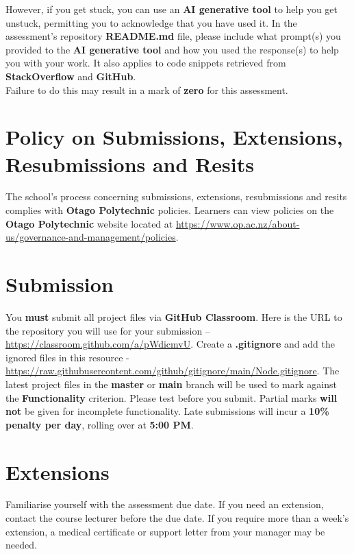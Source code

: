 \documentclass{article}
\begin{document}
 However, if you get stuck, you can use an \textbf{AI generative tool} to help you get unstuck, permitting you to acknowledge that you have used it. In the assessment's repository \textbf{README.md} file, please include what prompt(s) you provided to the \textbf{AI generative tool} and how you used the response(s) to help you with your work. It also applies to code snippets retrieved from \textbf{StackOverflow} and \textbf{GitHub}. \\
 
 Failure to do this may result in a mark of \textbf{zero} for this assessment. 

\section*{Policy on Submissions, Extensions, Resubmissions and Resits}
The school's process concerning submissions, extensions, resubmissions and resits complies with \textbf{Otago Polytechnic} policies. Learners can view policies on the \textbf{Otago Polytechnic} website located at \href{https://www.op.ac.nz/about-us/governance-and-management/policies}{https://www.op.ac.nz/about-us/governance-and-management/policies}.

\section*{Submission}
You \textbf{must} submit all project files via \textbf{GitHub Classroom}. Here is the URL to the repository you will use for your submission – \href{https://classroom.github.com/a/pWdicmvU}{https://classroom.github.com/a/pWdicmvU}.  Create a \textbf{.gitignore} and add the ignored files in this resource - \href{https://raw.githubusercontent.com/github/gitignore/main/Node.gitignore}{https://raw.githubusercontent.com/github/gitignore/main/Node.gitignore}. The latest project files in the \textbf{master} or \textbf{main} branch will be used to mark against the \textbf{Functionality} criterion. Please test before you submit. Partial marks \textbf{will not} be given for incomplete functionality. Late submissions will incur a \textbf{10\% penalty per day}, rolling over at \textbf{5:00 PM}.

\section*{Extensions}
Familiarise yourself with the assessment due date. If you need an extension, contact the course lecturer before the due date. If you require more than a week's extension, a medical certificate or support letter from your manager may be needed.
\end{document}
